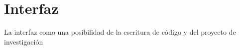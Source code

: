  \section{Interfaz}

La interfaz como una posibilidad de la escritura de código y del proyecto de investigación 
